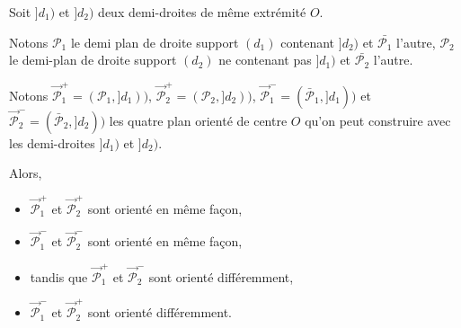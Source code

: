 \begin{prop}\label{prop-pairsplanoriente}
    Soit $]d_1)$ et $]d_2)$ deux demi-droites de même extrémité $O$. 
    
    Notons $\mathcal{P}_1$ le demi plan de droite support $(d_1)$ contenant $]d_2)$ et $\bar{\mathcal{P}_1}$ l'autre, $\mathcal{P}_2$ le demi-plan de droite support $(d_2)$ ne contenant pas $]d_1)$ et $\bar{\mathcal{P}_2}$ l'autre.

    Notons $\overrightarrow{\mathcal{P}}_1^+ = (\mathcal{P}_1,]d_1))$, $\overrightarrow{\mathcal{P}}_2^+ = (\mathcal{P}_2,]d_2))$, $\overrightarrow{\mathcal{P}}_1^- = (\bar{\mathcal{P}}_1,]d_1))$ et $\overrightarrow{\mathcal{P}}_2^- = (\bar{\mathcal{P}}_2,]d_2))$ les quatre plan orienté de centre $O$ qu'on peut construire avec les demi-droites $]d_1)$ et $]d_2)$. 

    Alors,
    \begin{itemize}[$\bullet$]
        \item $\overrightarrow{\mathcal{P}}_1^+$ et $\overrightarrow{\mathcal{P}}_2^+$ sont orienté en même façon,
        \item $\overrightarrow{\mathcal{P}}_1^-$ et $\overrightarrow{\mathcal{P}}_2^-$ sont orienté en même façon,
        \item tandis que $\overrightarrow{\mathcal{P}}_1^+$ et $\overrightarrow{\mathcal{P}}_2^-$ sont orienté différemment,
        \item $\overrightarrow{\mathcal{P}}_1^-$ et $\overrightarrow{\mathcal{P}}_2^+$ sont orienté différemment.
    \end{itemize}
\end{prop}

